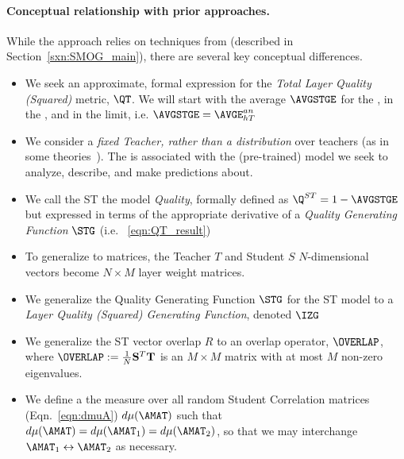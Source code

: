 \paragraph{Conceptual relationship with prior \STATMECH approaches.}
While the \SETOL approach relies on techniques from \SMOG (described in Section~\ref{sxn:SMOG_main}),
there are several key conceptual differences.
\begin{itemize}
\item  We seek an approximate, formal expression for the \emph{Total Layer Quality (Squared)}  metric, $\QT$.
       We will start with the \StudentTeacher average \GeneralizationError $\AVGSTGE$ for the \LinearPerceptron, in the \AnnealedApproximation, and in the \HighTemperature limit, i.e. $\AVGSTGE=\AVGE^{an}_{hT}$
\item  We consider a \emph{fixed Teacher, rather than a distribution} over teachers (as in some \STATMECH theories~\cite{engelBook}). 
  The \Teacher is associated with the (pre-trained) model we seek to analyze, describe, and make predictions about.
\item  We call the ST \AverageGeneralizationAccuracy the model \emph{Quality}, formally defined as $\Q^{ST}=1-\AVGSTGE$
  but expressed in terms of the appropriate derivative
  of a \emph{Quality Generating Function} $\STG$ (i.e. \EQN~\ref{eqn:QT_result})
\item  To generalize to matrices, the Teacher $T$ and Student $S$ $N$-dimensional \Perceptron vectors become $N\times M$ layer weight matrices.
\item  We generalize the Quality Generating Function $\STG$ for the ST model to a \emph{Layer Quality (Squared) Generating Function}, denoted $\IZG$
\item  We generalize the ST vector overlap $R$ to an overlap operator, $\OVERLAP$, where $\OVERLAP := \tfrac{1}{N}\mathbf{S}^{T}\mathbf{T}$ is an $M \times M$ matrix with at most $M$ non-zero eigenvalues.
\item  We define a the measure over all random Student Correlation matrices (Eqn.~\ref{eqn:dmuA})
       $d\mu(\AMAT)$ such that $d\mu(\AMAT)=d\mu(\AMAT_1)=d\mu(\AMAT_2)$, 
       so that we may interchange $\AMAT_{1}\leftrightarrow\AMAT_{2}$ as necessary.
\end{itemize}



